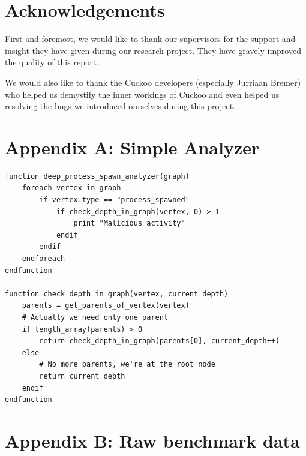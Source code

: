\documentclass{scrartcl}
\begin{document}
\clearpage

\section*{Acknowledgements}

First and foremost, we would like to thank our supervisors for the support and insight they have given during our research project. They have gravely improved the quality of this report.

We would also like to thank the Cuckoo developers (especially Jurriaan Bremer) who helped us demystify the inner workings of Cuckoo and even helped us resolving the bugs we introduced ourselves during this project.

\clearpage






\clearpage
\section*{Appendix A: Simple Analyzer}

\begin{lstlisting}
function deep_process_spawn_analyzer(graph)
    foreach vertex in graph
        if vertex.type == "process_spawned"
            if check_depth_in_graph(vertex, 0) > 1
                print "Malicious activity"
            endif
        endif
    endforeach
endfunction

function check_depth_in_graph(vertex, current_depth)
    parents = get_parents_of_vertex(vertex)
    # Actually we need only one parent
    if length_array(parents) > 0
        return check_depth_in_graph(parents[0], current_depth++)
    else
        # No more parents, we're at the root node
        return current_depth
    endif
endfunction
\end{lstlisting}

\clearpage

\section*{Appendix B: Raw benchmark data}

\end{document}
